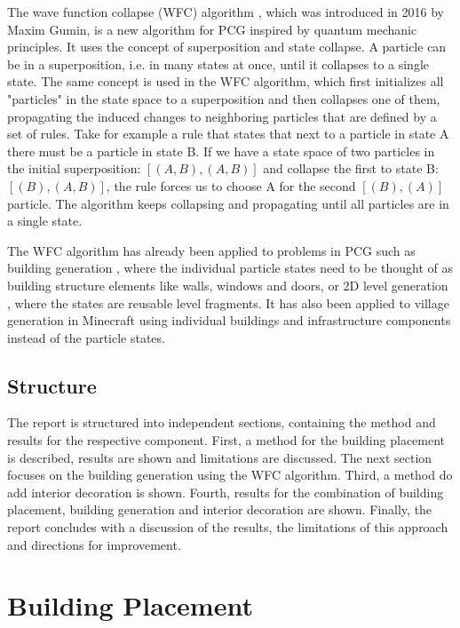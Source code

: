 \documentclass[
oneside,
fontsize=11pt
]{scrartcl}
\begin{document}
The wave function collapse (WFC) algorithm \cite{WFC_GitHub}, 
which was introduced in 2016 by Maxim Gumin, 
is a new algorithm for PCG inspired by quantum mechanic principles.
It uses the concept of 
superposition and state collapse. 
A particle can be in a superposition, i.e. in many states at once,
until it collapses to a single state. 
The same concept is used in the WFC algorithm, 
which first initializes all "particles" in the state space 
to a superposition and then collapses one of them, 
propagating the induced changes to neighboring particles 
that are defined by a set of rules. 
Take for example a rule that states that next to a particle in state A
there must be a particle in state B.
If we have a state space of two particles in the initial superposition:
$[(A,B), (A,B)]$ and collapse the first to state B: $[(B), (A,B)]$, 
the rule forces us to choose A for the second $[(B), (A)]$ particle.
The algorithm keeps collapsing and propagating until all 
particles are in a single state. 


The WFC algorithm has already been applied to
problems in PCG such as building generation \cite{Eleni-2020}, 
where the individual particle states need to be thought of as building structure elements 
like walls, windows and doors, 
or 2D level generation \cite{WFC_YouTube},
where the states are reusable level fragments.
It has also been applied to village generation in Minecraft \cite{Mifek-2022}
using individual buildings and infrastructure components instead of the particle states.


\subsection*{Structure}
The report is structured into independent sections, 
containing the method and results for the respective component.
First, a method for the building placement is described, results are shown and limitations are discussed.
The next section focuses on the building generation 
using the WFC algorithm. %
Third, a method do add interior decoration is shown.
Fourth, results for the combination of building placement, building generation and interior decoration are shown.
Finally, the report concludes with a discussion of the results, the limitations of this approach and 
directions for improvement.


\section{Building Placement}
\end{document}
